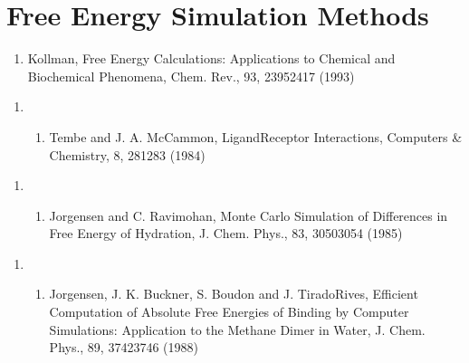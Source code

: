 \documentclass[letterpaper,11pt,english]{sphinxmanual}
\begin{document}
\section{Free Energy Simulation Methods}
\label{\detokenize{text/references:free-energy-simulation-methods}}\begin{enumerate}
%
\setcounter{enumi}{15}
\item {} 
Kollman, Free Energy Calculations: Applications to Chemical and Biochemical Phenomena, Chem. Rev., 93, 2395\sphinxhyphen{}2417 (1993)

\end{enumerate}
\begin{enumerate}
%
\setcounter{enumi}{1}
\item {} \begin{enumerate}
%
\setcounter{enumii}{11}
\item {} 
Tembe and J. A. McCammon, Ligand\sphinxhyphen{}Receptor Interactions, Computers \& Chemistry, 8, 281\sphinxhyphen{}283 (1984)

\end{enumerate}

\end{enumerate}
\begin{enumerate}
%
\setcounter{enumi}{22}
\item {} \begin{enumerate}
%
\setcounter{enumii}{11}
\item {} 
Jorgensen and C. Ravimohan, Monte Carlo Simulation of Differences in Free Energy of Hydration, J. Chem. Phys., 83, 3050\sphinxhyphen{}3054 (1985)

\end{enumerate}

\end{enumerate}
\begin{enumerate}
%
\setcounter{enumi}{22}
\item {} \begin{enumerate}
%
\setcounter{enumii}{11}
\item {} 
Jorgensen, J. K. Buckner, S. Boudon and J. Tirado\sphinxhyphen{}Rives, Efficient Computation of Absolute Free Energies of Binding by Computer Simulations:  Application to the Methane Dimer in Water, J. Chem. Phys., 89, 3742\sphinxhyphen{}3746 (1988)

\end{enumerate}

\end{enumerate}
\end{document}

